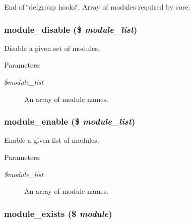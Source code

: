 End of \char`\"{}defgroup hooks\char`\"{}. Array of modules required by core. \hypertarget{module_8inc_30b7c8c58fd142f2df58e8de113ccd55}{
\subsubsection[{module\_\-disable}]{\setlength{\rightskip}{0pt plus 5cm}module\_\-disable (\$ {\em module\_\-list})}}
\label{module_8inc_30b7c8c58fd142f2df58e8de113ccd55}


Disable a given set of modules.

\begin{Desc}
\item[Parameters:]
\begin{description}
\item[{\em \$module\_\-list}]An array of module names. \end{description}
\end{Desc}
\hypertarget{module_8inc_23013c512e0fdb2dacefbe388f713841}{
\subsubsection[{module\_\-enable}]{\setlength{\rightskip}{0pt plus 5cm}module\_\-enable (\$ {\em module\_\-list})}}
\label{module_8inc_23013c512e0fdb2dacefbe388f713841}


Enable a given list of modules.

\begin{Desc}
\item[Parameters:]
\begin{description}
\item[{\em \$module\_\-list}]An array of module names. \end{description}
\end{Desc}
\hypertarget{module_8inc_83bfe4eac372da50ff3eaf949b1b6ff8}{
\subsubsection[{module\_\-exists}]{\setlength{\rightskip}{0pt plus 5cm}module\_\-exists (\$ {\em module})}}
\label{module_8inc_83bfe4eac372da50ff3eaf949b1b6ff8}


